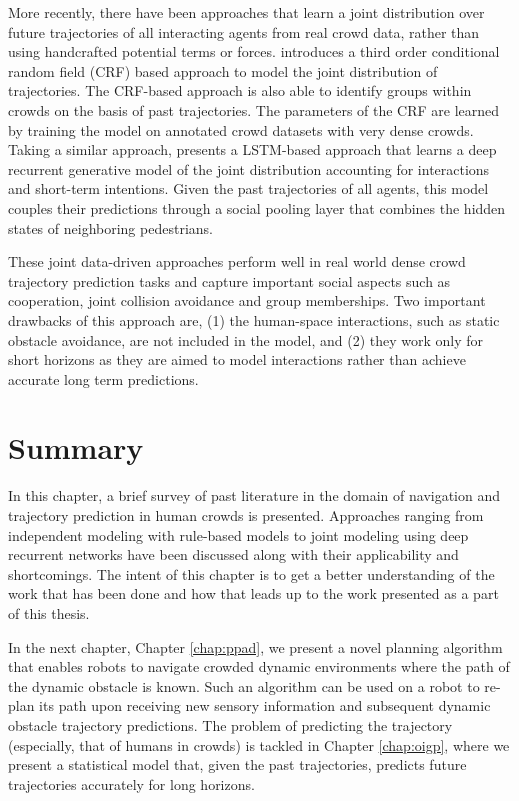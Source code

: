 More recently, there have been approaches that learn a joint distribution over future trajectories of all interacting agents from real crowd data, rather than using handcrafted potential terms or forces. \cite{pellegrini2010improving} introduces a third order conditional random field (CRF) based approach to model the joint distribution of trajectories. The CRF-based approach is also able to identify groups within crowds on the basis of past trajectories. The parameters of the CRF are learned by training the model on annotated crowd datasets with very dense crowds. Taking a similar approach, \cite{alahi16} presents a LSTM-based approach that learns a deep recurrent generative model of the joint distribution accounting for interactions and short-term intentions. Given the past trajectories of all agents, this model couples their predictions through a social pooling layer that combines the hidden states of neighboring pedestrians.

These joint data-driven approaches perform well in real world dense crowd trajectory prediction tasks and capture important social aspects such as cooperation, joint collision avoidance and group memberships. Two important drawbacks of this approach are, (1) the human-space interactions, such as static obstacle avoidance, are not included in the model, and (2) they work only for short horizons as they are aimed to model interactions rather than achieve accurate long term predictions.

\section{Summary}
\label{sec:survey-summary}

In this chapter, a brief survey of past literature in the domain of navigation and trajectory prediction in human crowds is presented. Approaches ranging from independent modeling with rule-based models to joint modeling using deep recurrent networks have been discussed along with their applicability and shortcomings. The intent of this chapter is to get a better understanding of the work that has been done and how that leads up to the work presented as a part of this thesis.

In the next chapter, Chapter \ref{chap:ppad}, we present a novel planning algorithm that enables robots to navigate crowded dynamic environments where the path of the dynamic obstacle is known. Such an algorithm can be used on a robot to re-plan its path upon receiving new sensory information and subsequent dynamic obstacle trajectory predictions. The problem of predicting the trajectory (especially, that of humans in crowds) is tackled in Chapter \ref{chap:oigp}, where we present a statistical model that, given the past trajectories, predicts future trajectories accurately for long horizons.

